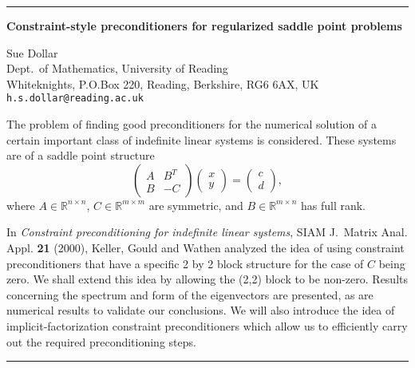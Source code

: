 \documentclass[twosided]{report}
\newcommand{\Reals}{\mathbb{R}}
\newcommand{\TwoVec}[2]{ \left(
	\begin{array}{c}
	#1 \\ #2
	\end{array}
	\right) }
\newcommand{\TwoMatrx}[4]{ \left(
	\begin{array}{cc}
	#1 & #2 \\
	#3 & #4
	\end{array}
	\right) }
\begin{document}
	\begin{center} \rule{6in}{1pt} \end{center}

\begin{center}
{\large			%
{\bf Constraint-style preconditioners for regularized saddle point problems}}

	Sue Dollar \\
	Dept.~of Mathematics, University of Reading \\
	Whiteknights, P.O.Box 220, Reading, Berkshire, RG6 6AX, UK
	\\ {\tt h.s.dollar@reading.ac.uk}
\end{center}
The problem of finding good preconditioners for the numerical
solution of a certain important class of indefinite linear
systems is considered. These systems are of a saddle point
structure
$$ \TwoMatrx{A}{B^T}{B}{-C} \TwoVec{x}{y} = \TwoVec{c}{d}, $$
where $A\in\Reals^{n\times n}$,
$C\in\Reals^{m\times m}$ are symmetric,
and $B\in\Reals^{m\times n}$ has full rank.

In {\em
Constraint preconditioning for indefinite linear systems},
SIAM J.~Matrix Anal. Appl. {\bf 21} (2000),
Keller, Gould and Wathen analyzed the idea of
using constraint preconditioners that have a
specific 2 by 2 block structure for the case of
$C$ being zero. We
shall extend this idea by allowing the (2,2) block to be
non-zero. Results concerning the spectrum and form of the
eigenvectors are presented, as are numerical results to validate
our conclusions.
We will also introduce the idea of
implicit-factorization constraint preconditioners which allow us
to efficiently carry out the required preconditioning steps.



	\begin{center} \rule{6in}{1pt} \end{center}
\end{document}
